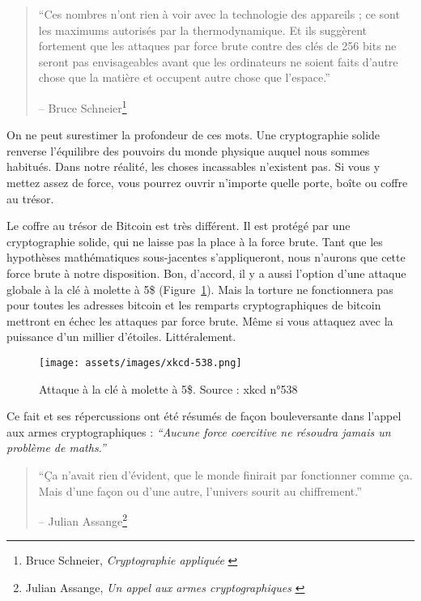 \begin{quotation}\begin{samepage}
\enquote{Ces nombres n'ont rien à voir avec la technologie des appareils ; ce
sont les maximums autorisés par la thermodynamique. Et ils suggèrent fortement
que les attaques par force brute contre des clés de 256 bits ne seront pas
envisageables avant que les ordinateurs ne soient faits d'autre chose que la
matière et occupent autre chose que l'espace.}
\begin{flushright} -- Bruce Schneier\footnote{Bruce Schneier,
\textit{Cryptographie appliquée} \cite{bruce-schneier}}
\end{flushright}\end{samepage}\end{quotation}

On ne peut surestimer la profondeur de ces mots. Une cryptographie solide
renverse l'équilibre des pouvoirs du monde physique auquel nous sommes habitués.
Dans notre réalité, les choses incassables n'existent pas. Si vous y mettez
assez de force, vous pourrez ouvrir n'importe quelle porte, boîte ou coffre au
trésor.

Le coffre au trésor de Bitcoin est très différent. Il est protégé par une
cryptographie solide, qui ne laisse pas la place à la force brute. Tant que les
hypothèses mathématiques sous-jacentes s'appliqueront, nous n'aurons que cette
force brute à notre disposition. Bon, d'accord, il y a aussi l'option d'une
attaque globale à la clé à molette à 5\$ (Figure~\ref{fig:xkcd-538}). Mais la
torture ne fonctionnera pas pour toutes les adresses bitcoin et les remparts
cryptographiques de bitcoin mettront en échec les attaques par force brute.
Même si vous attaquez avec la puissance d'un millier d'étoiles. Littéralement.

\begin{figure}
  \centering
  \texttt{[image: assets/images/xkcd-538.png]}
  \caption{Attaque à la clé à molette à 5\$. Source : xkcd n°538}
  \label{fig:xkcd-538}
\end{figure}

Ce fait et ses répercussions ont été résumés de façon bouleversante dans l'appel
aux armes cryptographiques : \textit{\enquote{Aucune force coercitive ne
résoudra jamais un problème de maths.}}

\begin{quotation}\begin{samepage}
\enquote{Ça n'avait rien d'évident, que le monde finirait par fonctionner comme
ça. Mais d'une façon ou d'une autre, l'univers sourit au chiffrement.}
\begin{flushright} -- Julian Assange\footnote{Julian Assange, \textit{Un appel
aux armes cryptographiques} \cite{call-to-cryptographic-arms}}
\end{flushright}\end{samepage}\end{quotation}

